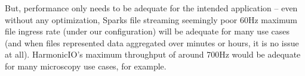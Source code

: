 \documentclass[conference]{IEEEtran}
\begin{document}

But, performance only needs to be adequate for the intended application -- even without any optimization, Sparks file streaming seemingly poor 60Hz maximum file ingress rate (under our configuration) will be adequate for many use cases (and when files represented data aggregated over minutes or hours, it is no issue at all). HarmonicIO's maximum throughput of around 700Hz would be adequate for many microscopy use cases, for example.
\end{document}
